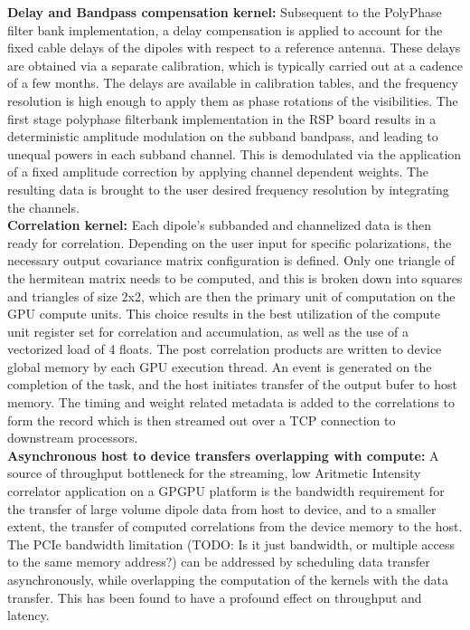 \documentclass{ws-jai}
\begin{document}
\noindent \textbf {Delay  and Bandpass compensation  kernel:} Subsequent to  the PolyPhase
filter bank implementation,  a delay compensation is applied to  account for the
fixed cable  delays of the dipoles  with respect to a  reference antenna.  These
delays are obtained  via a separate calibration, which is  typically carried out
at a cadence of  a few months.  The delays are  available in calibration tables,
and the frequency resolution is high enough  to apply them as phase rotations of
the visibilities. The first stage polyphase filterbank implementation in the RSP
board results in  a deterministic amplitude modulation on  the subband bandpass,
and leading to unequal powers in  each subband channel.  This is demodulated via
the application  of a fixed  amplitude correction by applying  channel dependent
weights. The resulting data is brought  to the user desired frequency resolution
by integrating the channels.\\

\noindent \textbf {Correlation  kernel:} Each dipole's  subbanded and channelized  data is
then  ready  for  correlation.   Depending   on  the  user  input  for  specific
polarizations,  the   necessary  output   covariance  matrix   configuration  is
defined. Only  one triangle of  the hermitean matrix  needs to be  computed, and
this is broken down  into squares and triangles of size 2x2,  which are then the
primary unit of computation on the GPU compute units. This choice results in the
best  utilization  of  the  compute   unit  register  set  for  correlation  and
accumulation, as  well as the use  of a vectorized  load of 4 floats.   The post
correlation products are  written to device global memory by  each GPU execution
thread.  An  event is  generated on  the completion  of the  task, and  the host
initiates transfer  of the output  bufer to host  memory. The timing  and weight
related metadata is added  to the correlations to form the  record which is then
streamed out over a TCP connection to downstream processors.\\

\noindent \textbf  {Asynchronous host  to device  transfers overlapping  with compute:}  A
source  of throughput  bottleneck  for the  streaming,  low Aritmetic  Intensity
correlator application on a GPGPU platform  is the bandwidth requirement for the
transfer of  large volume  dipole data  from host  to device,  and to  a smaller
extent, the  transfer of  computed correlations  from the  device memory  to the
host. The  PCIe bandwidth limitation  (TODO: Is  it just bandwidth,  or multiple
access to the same memory address?) can be addressed by scheduling data transfer
asynchronously, while overlapping  the computation of the kernels  with the data
transfer.  This has  been found  to  have a  profound effect  on throughput  and
latency.\\
\end{document}
